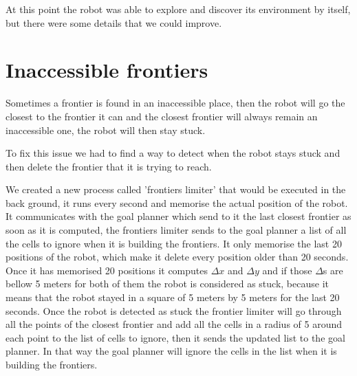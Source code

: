 At this point the robot was able to explore and discover its environment by itself, but there were some details that we could improve.

\section{Inaccessible frontiers}

Sometimes a frontier is found in an inaccessible place, then the robot will go the closest to the frontier it can and the closest frontier will always remain an inaccessible one, the robot will then stay stuck.

To fix this issue we had to find a way to detect when the robot stays stuck and then delete the frontier that it is trying to reach.

We created a new process called 'frontiers limiter' that would be executed in the back ground, it runs every second and memorise the actual position of the robot.
It communicates with the goal planner which send to it the last closest frontier as soon as it is computed, the frontiers limiter sends to the goal planner a list of all the cells to ignore when it is building the frontiers.
It only memorise the last 20 positions of the robot, which make it delete every position older than 20 seconds.
Once it has memorised 20 positions it computes $\Delta x$ and $\Delta y$ and if those $\Delta$s are bellow 5 meters for both of them the robot is considered as stuck, because it means that the robot stayed in a square of 5 meters by 5 meters for the last 20 seconds.
Once the robot is detected as stuck the frontier limiter will go through all the points of the closest frontier and add all the cells in a radius of 5 around each point to the list of cells to ignore, then it sends the updated list to the goal planner.
In that way the goal planner will ignore the cells in the list when it is building the frontiers.

